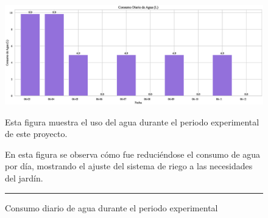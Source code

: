 \documentclass[pdflatex,sn-mathphys-num]{sn-jnl}%
\theoremstyle{thmstyleone}%
\theoremstyle{thmstyletwo}%
\theoremstyle{thmstylethree}%
\begin{document}
\begin{figure}[!ht]
    \centering
    \includegraphics[width=1\textwidth]{assets/consumo_diario_barras.eps}

    \caption{Consumo diario de agua durante el periodo experimental}
    \label{fig:consumo}

    \vspace{0.4cm}

    \noindent
    \begin{minipage}[t]{0.48\textwidth}
        \raggedright
        Esta figura muestra el uso del agua durante el periodo experimental de este proyecto.
    \end{minipage}
    \hfill
    \begin{minipage}[t]{0.48\textwidth}
        \justifying
        En esta figura se observa cómo fue reduciéndose el consumo de agua por día, mostrando el ajuste del sistema de riego a las necesidades del jardín.
    \end{minipage}

    \vspace{0.5cm}
    \hrule
\end{figure}
\end{document}
